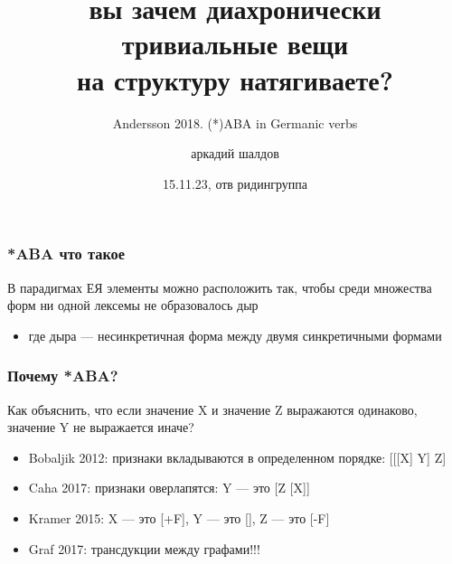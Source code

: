 \documentclass[9pt, t]{beamer}
\title{вы зачем диахронически тривиальные вещи\\на структуру натягиваете?}
\subtitle{Andersson 2018. (*)ABA in Germanic verbs}
\author{аркадий шалдов}
\date{15.11.23, отв ридингруппа}
\begin{document}

\begin{frame}
    \titlepage
\end{frame}

\begin{frame}
    \frametitle{*ABA что такое}

    В парадигмах ЕЯ элементы можно расположить так, чтобы среди множества форм ни одной лексемы не образовалось дыр
    
    \begin{itemize}
        \item[] где дыра — несинкретичная форма между двумя синкретичными формами
    \end{itemize}



\end{frame}

\begin{frame}
    \frametitle{Почему *ABA?}

    Как объяснить, что если значение X и значение Z выражаются одинаково, значение Y не выражается иначе?

    \begin{itemize}
        \item Bobaljik 2012: признаки вкладываются в определенном порядке: \textsc{[[[X] Y] Z]}
    
        \item Caha 2017: признаки оверлапятся: Y — это \textsc{[Z [X]]}
        
        \item Kramer 2015: X — это [+F], Y — это [], Z — это [-F]
        
        \item Graf 2017: трансдукции между графами!!!
    
    \end{itemize}
\end{frame}
\end{document}
